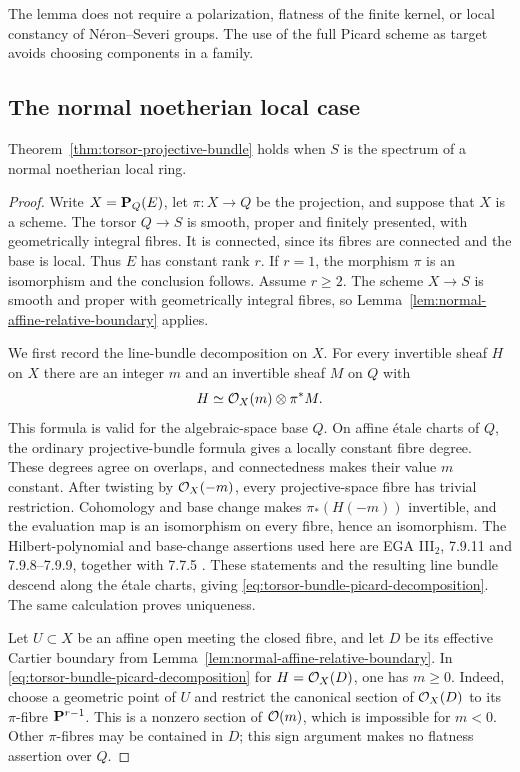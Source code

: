 The lemma does not require a polarization, flatness of the finite
kernel, or local constancy of N\'eron--Severi groups. The use of the
full Picard scheme as target avoids choosing components in a family.

\subsection{The normal noetherian local case}

\begin{proposition}\label{prop:normal-local-torsor-projective-bundle}
Theorem~\ref{thm:torsor-projective-bundle} holds when $S$ is
the spectrum of a normal noetherian local ring.
\end{proposition}

\begin{proof}
Write $X=\mathbf P_Q(E)$, let $\pi:X\to Q$ be the projection, and suppose
that $X$ is a scheme. The torsor $Q\to S$ is smooth, proper and
finitely presented, with geometrically integral fibres. It is
connected, since its fibres are connected and the base is local.
Thus $E$ has constant rank $r$. If $r=1$, the morphism $\pi$ is an
isomorphism and the conclusion follows. Assume $r\geq2$.
The scheme $X\to S$ is smooth and proper with geometrically integral
fibres, so Lemma~\ref{lem:normal-affine-relative-boundary} applies.

We first record the line-bundle decomposition on $X$. For every
invertible sheaf $H$ on $X$ there are an integer $m$ and an invertible
sheaf $M$ on $Q$ with
\begin{equation}\label{eq:torsor-bundle-picard-decomposition}
 H\simeq\mathcal O_X(m)\otimes\pi^*M.
\end{equation}
This formula is valid for the algebraic-space base $Q$. On affine
\'etale charts of $Q$, the ordinary projective-bundle formula gives
a locally constant fibre degree. These degrees agree on overlaps,
and connectedness makes their value $m$ constant. After twisting
by $\mathcal O_X(-m)$, every projective-space fibre has trivial restriction.
Cohomology and base change makes $\pi_*(H(-m))$ invertible, and the
evaluation map is an isomorphism on every fibre, hence an isomorphism.
The Hilbert-polynomial and base-change assertions used here are
EGA III$_2$, 7.9.11 and 7.9.8--7.9.9, together with 7.7.5
\cite{EGA}. These statements and the resulting line bundle
descend along the
\'etale charts, giving \eqref{eq:torsor-bundle-picard-decomposition}.
The same calculation proves uniqueness.

Let $U\subset X$ be an affine open meeting the closed fibre, and let
$D$ be its effective Cartier boundary from
Lemma~\ref{lem:normal-affine-relative-boundary}. In
\eqref{eq:torsor-bundle-picard-decomposition} for $H=\mathcal O_X(D)$,
one has $m\geq0$. Indeed, choose a geometric point of $U$ and
restrict the canonical section of $\mathcal O_X(D)$ to its
$\pi$-fibre $\mathbf P^{r-1}$. This is a nonzero section of $\mathcal O(m)$,
which is impossible for $m<0$. Other $\pi$-fibres may be contained
in $D$; this sign argument makes no flatness assertion over $Q$.


\end{proof}
